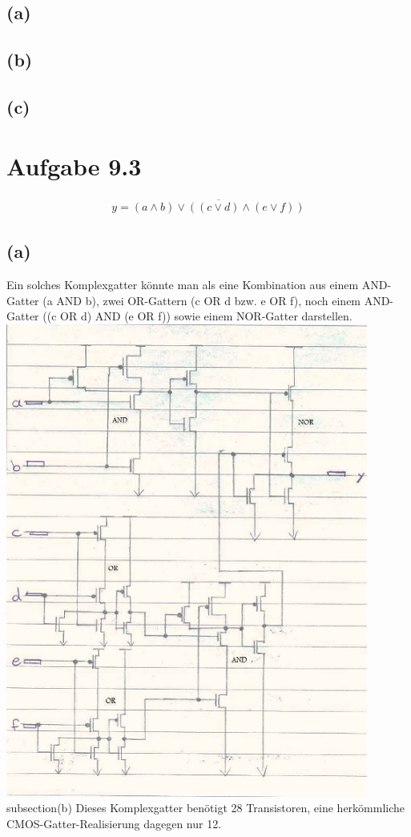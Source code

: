 \documentclass[12pt]{article}
\begin{document}
\subsection{(a)}
\subsection{(b)}
\subsection{(c)}

\section{Aufgabe 9.3}
\begin{align}
y = \overline{(a \land b) \lor ((c \lor d) \land (e \lor f))}
\end{align}
\subsection{(a)}
Ein solches Komplexgatter könnte man als eine Kombination aus einem
AND-Gatter (a AND b), zwei OR-Gattern (c OR d bzw. e OR f), noch
einem AND-Gatter ((c OR d) AND (e OR f)) sowie einem NOR-Gatter
darstellen.
\includegraphics{Schaltskizze93a}
subsection{(b)}
Dieses Komplexgatter benötigt 28 Transistoren, eine herkömmliche CMOS-Gatter-Realisierung dagegen nur 12.
\end{document}
